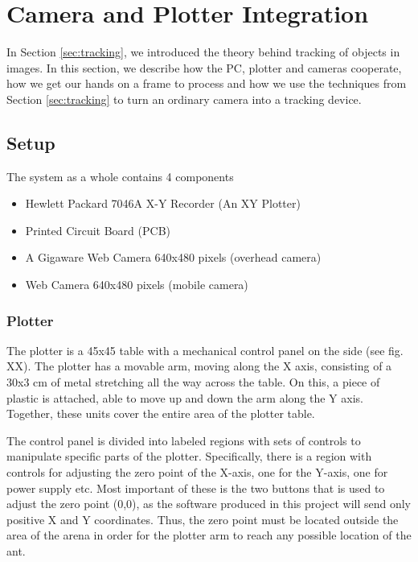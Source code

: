 
\section{Camera and Plotter Integration}

In Section \ref{sec:tracking}, we introduced the theory behind tracking of objects in images. In this section, we describe how the PC, plotter and cameras cooperate, how we get our hands on a frame to process and how we use the techniques from Section \ref{sec:tracking} to turn an ordinary camera into a tracking device.

\subsection{Setup}

The system as a whole contains 4 components

\begin{itemize}
  \item Hewlett Packard 7046A X-Y Recorder (An XY Plotter)
  \item Printed Circuit Board (PCB)
  \item A Gigaware Web Camera 640x480 pixels (overhead camera)
  \item Web Camera 640x480 pixels (mobile camera)
\end{itemize}

\subsubsection{Plotter}
The plotter is a 45x45 table with a mechanical control panel on the side (see fig. XX). The plotter has a movable arm, moving along the X axis, consisting of a 30x3 cm of metal stretching all the way across the table. On this, a piece of plastic is attached, able to move up and down the arm along the Y axis. Together, these units cover the entire area of the plotter table.

The control panel is divided into labeled regions with sets of controls to manipulate specific parts of the plotter. Specifically, there is a region with controls for adjusting the zero point of the X-axis, one for the Y-axis, one for power supply etc. Most important of these is the two buttons that is used to adjust the zero point (0,0), as the software produced in this project will send only positive X and Y coordinates. Thus, the zero point must be located outside the area of the arena in order for the plotter arm to reach any possible location of the ant.

